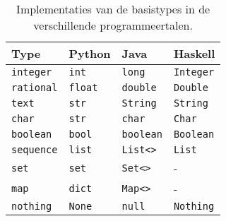 \begin{table}
    \centering
    \caption{Implementaties van de basistypes in de verschillende programmeertalen.}
    \label{tab:basistypes}
    \begin{tabular}{|l|lll|}
        \hline
        Type              & Python          & Java              & Haskell           \\
        \hline
        \texttt{integer}  & \texttt{int}    & \texttt{long}     & \texttt{Integer}  \\
        \texttt{rational} & \texttt{float}  & \texttt{double}   & \texttt{Double}   \\
        \texttt{text}     & \texttt{str}    & \texttt{String}   & \texttt{String}   \\
        \texttt{char}     & \texttt{str}    & \texttt{char}     & \texttt{Char}     \\
        \texttt{boolean}  & \texttt{bool}   & \texttt{boolean}  & \texttt{Boolean}  \\
        \texttt{sequence} & \texttt{list}   & \texttt{List<>}   & \texttt{List}     \\
        \texttt{set}      & \texttt{set}    & \texttt{Set<>}    & -        \\
        \texttt{map}      & \texttt{dict}   & \texttt{Map<>}    & -        \\
        \texttt{nothing}  & \texttt{None}   & \texttt{null}     & \texttt{Nothing}  \\
        \hline
    \end{tabular}
\end{table}


